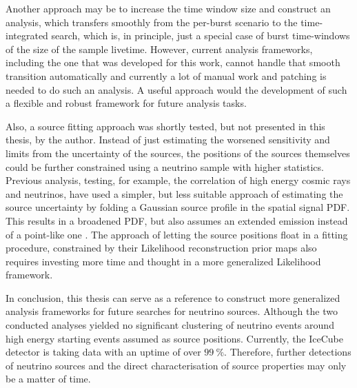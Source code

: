Another approach may be to increase the time window size and construct an analysis, which transfers smoothly from the per-burst scenario to the time-integrated search, which is, in principle, just a special case of burst time-windows of the size of the sample livetime.
However, current analysis frameworks, including the one that was developed for this work, cannot handle that smooth transition automatically and currently a lot of manual work and patching is needed to do such an analysis.
A useful approach would the development of such a flexible and robust framework for future analysis tasks.

Also, a source fitting approach was shortly tested, but not presented in this thesis, by the author.
Instead of just estimating the worsened sensitivity and limits from the uncertainty of the sources, the positions of the sources themselves could be further constrained using a neutrino sample with higher statistics.
Previous analysis, testing, for example, the correlation of high energy cosmic rays and neutrinos, have used a simpler, but less suitable approach of estimating the source uncertainty by folding a Gaussian source profile in the spatial signal PDF.
This results in a broadened PDF, but also assumes an extended emission instead of a point-like one \cite{Aartsen:2015dml}.
The approach of letting the source positions float in a fitting procedure, constrained by their Likelihood reconstruction prior maps also requires investing more time and thought in a more generalized Likelihood framework.

In conclusion, this thesis can serve as a reference to construct more generalized analysis frameworks for future searches for neutrino sources.
Although the two conducted analyses yielded no significant clustering of neutrino events around high energy starting events assumed as source positions.
Currently, the IceCube detector is taking data with an uptime of over $\SI{99}{\percent}$.
Therefore, further detections of neutrino sources and the direct characterisation of source properties may only be a matter of time.


